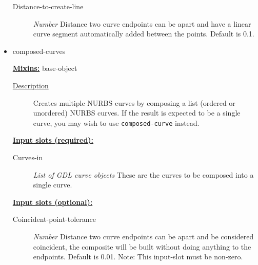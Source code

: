 \documentclass [11pt]{book}
\begin{document}
\begin{itemize}
\begin{description}
\item [Distance-to-create-line]
\emph{Number} Distance two curve endpoints can be apart and have a linear curve segment automatically added between the points. Default is 0.1.


\end{description}







\item {}composed-curves


\textbf{
\underline{Mixins:}} base-object





\begin{description}

\item [
\underline{Description}]


Creates multiple NURBS curves by composing a list (ordered or unordered) NURBS curves. 
If the result is expected to be a single curve, you may wish to use \texttt{composed-curve} instead.



\end{description}








\textbf{
\underline{Input slots (required):}}

\begin{description}

\item [Curves-in]
\emph{List of GDL curve objects} These are the curves to be composed into a single curve.


\end{description}






\textbf{
\underline{Input slots (optional):}}

\begin{description}

\item [Coincident-point-tolerance]
\emph{Number} Distance two curve endpoints can be apart and be considered coincident, the composite will be built
without doing anything to the endpoints. Default is 0.01. Note: This input-slot must be non-zero.



\end{description}
\end{itemize}
\end{document}
